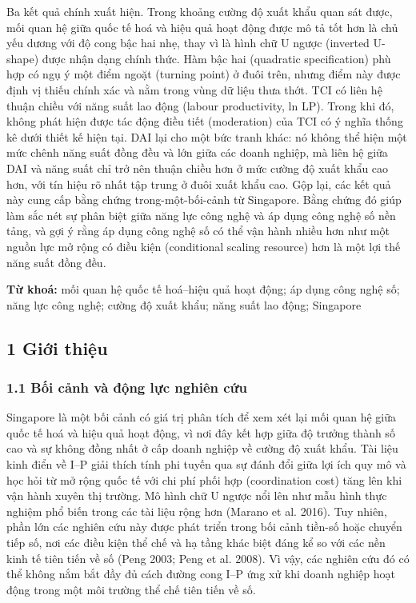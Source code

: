 \documentclass[12pt,a4paper]{article}
\begin{document}
Ba kết quả chính xuất hiện. Trong khoảng cường độ xuất khẩu quan sát
được, mối quan hệ giữa quốc tế hoá và hiệu quả hoạt động được mô tả tốt
hơn là chủ yếu dương với độ cong bậc hai nhẹ, thay vì là hình chữ U
ngược (inverted U-shape) được nhận dạng chính thức. Hàm bậc hai
(quadratic specification) phù hợp có ngụ ý một điểm ngoặt (turning
point) ở đuôi trên, nhưng điểm này được định vị thiếu chính xác và nằm
trong vùng dữ liệu thưa thớt. TCI có liên hệ thuận chiều với năng suất
lao động (labour productivity, ln LP). Trong khi đó, không phát hiện
được tác động điều tiết (moderation) của TCI có ý nghĩa thống kê dưới
thiết kế hiện tại. DAI lại cho một bức tranh khác: nó không thể hiện một
mức chênh năng suất đồng đều và lớn giữa các doanh nghiệp, mà liên hệ
giữa DAI và năng suất chỉ trở nên thuận chiều hơn ở mức cường độ xuất
khẩu cao hơn, với tín hiệu rõ nhất tập trung ở đuôi xuất khẩu cao. Gộp
lại, các kết quả này cung cấp bằng chứng trong-một-bối-cảnh từ
Singapore. Bằng chứng đó giúp làm sắc nét sự phân biệt giữa năng lực
công nghệ và áp dụng công nghệ số nền tảng, và gợi ý rằng áp dụng công
nghệ số có thể vận hành nhiều hơn như một nguồn lực mở rộng có điều kiện
(conditional scaling resource) hơn là một lợi thế năng suất đồng đều.

\textbf{Từ khoá:} mối quan hệ quốc tế hoá--hiệu quả hoạt động; áp dụng
công nghệ số; năng lực công nghệ; cường độ xuất khẩu; năng suất lao
động; Singapore

\hypertarget{1-giux1edbi-thiux1ec7u}{%
\subsection{1 Giới thiệu}\label{1-giux1edbi-thiux1ec7u}}

\hypertarget{11-bux1ed1i-cux1ea3nh-vuxe0-ux111ux1ed9ng-lux1ef1c-nghiuxean-cux1ee9u}{%
\subsubsection{1.1 Bối cảnh và động lực nghiên
cứu}\label{11-bux1ed1i-cux1ea3nh-vuxe0-ux111ux1ed9ng-lux1ef1c-nghiuxean-cux1ee9u}}

Singapore là một bối cảnh có giá trị phân tích để xem xét lại mối quan
hệ giữa quốc tế hoá và hiệu quả hoạt động, vì nơi đây kết hợp giữa độ
trưởng thành số cao và sự không đồng nhất ở cấp doanh nghiệp về cường độ
xuất khẩu. Tài liệu kinh điển về I--P giải thích tính phi tuyến qua sự
đánh đổi giữa lợi ích quy mô và học hỏi từ mở rộng quốc tế với chi phí
phối hợp (coordination cost) tăng lên khi vận hành xuyên thị trường. Mô
hình chữ U ngược nổi lên như mẫu hình thực nghiệm phổ biến trong các tài
liệu rộng hơn (Marano et al. 2016). Tuy nhiên, phần lớn các nghiên cứu
này được phát triển trong bối cảnh tiền-số hoặc chuyển tiếp số, nơi các
điều kiện thể chế và hạ tầng khác biệt đáng kể so với các nền kinh tế
tiên tiến về số (Peng 2003; Peng et al. 2008). Vì vậy, các nghiên cứu đó
có thể không nắm bắt đầy đủ cách đường cong I--P ứng xử khi doanh nghiệp
hoạt động trong một môi trường thể chế tiên tiến về số.
\end{document}
